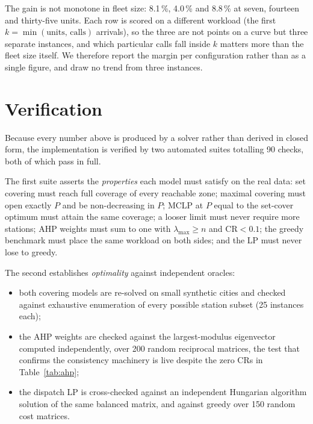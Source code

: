 \documentclass[conference]{IEEEtran}
\begin{document}
The gain is not monotone in fleet size: 8.1\,\%, 4.0\,\% and 8.8\,\% at
seven, fourteen and thirty-five units. Each row is scored on a different
workload (the first $k=\min(\text{units},\,\text{calls})$ arrivals), so the
three are not points on a curve but three separate instances, and which
particular calls fall inside $k$ matters more than the fleet size itself. We
therefore report the margin per configuration rather than as a single figure,
and draw no trend from three instances.

\section{Verification}
\label{sec:verification}

Because every number above is produced by a solver rather than derived in closed
form, the implementation is verified by two automated suites totalling 90
checks, both of which pass in full.

The first suite asserts the \emph{properties} each model must satisfy on the
real data: set covering must reach full coverage of every reachable zone;
maximal covering must open exactly $P$ and be non-decreasing in $P$; MCLP at $P$
equal to the set-cover optimum must attain the same coverage; a looser limit must
never require more stations; AHP weights must sum to one with $\lambda_{\max} \ge
n$ and $\mathrm{CR} < 0.1$; the greedy benchmark must place the same workload on
both sides; and the LP must never lose to greedy.

The second establishes \emph{optimality} against independent oracles:

\begin{itemize}
  \item both covering models are re-solved on small synthetic cities and checked
    against exhaustive enumeration of every possible station subset (25
    instances each);
  \item the AHP weights are checked against the largest-modulus eigenvector
    computed independently, over 200 random reciprocal matrices, the test
    that confirms the consistency machinery is live despite the zero CRs in
    Table~\ref{tab:ahp};
  \item the dispatch LP is cross-checked against an independent Hungarian
    algorithm solution of the same balanced matrix, and against greedy over 150
    random cost matrices.
\end{itemize}
\end{document}
